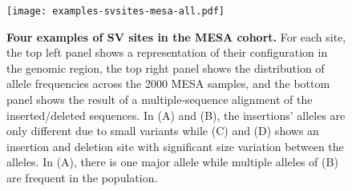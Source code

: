 \documentclass[11pt]{ucscthesis}
\begin{document}
\begin{figure}[H]
  \centering



  \texttt{[image: examples-svsites-mesa-all.pdf]}
  \caption[Four examples of SV sites in the MESA cohort]{{\bf Four examples of SV sites in the MESA cohort.}
    For each site, the top left panel shows a representation of their configuration in the genomic region, the top right panel shows the distribution of allele frequencies across the 2000 MESA samples, and the bottom panel shows the result of a multiple-sequence alignment of the inserted/deleted sequences.
    In (A) and (B), the insertions' alleles are only different due to small variants while (C) and (D) shows an insertion and deletion site with significant size variation between the alleles.
    In (A), there is one major allele while multiple alleles of (B) are frequent in the population. }
  \label{fig:mesa-svsite-examples}
\end{figure}
\end{document}
